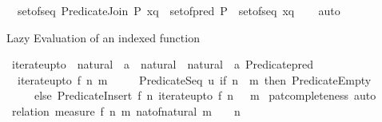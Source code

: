 \begin{isabellebody}
\ \ {\isachardoublequoteopen}set{\isacharunderscore}{\kern0pt}of{\isacharunderscore}{\kern0pt}seq\ {\isacharparenleft}{\kern0pt}Predicate{\isachardot}{\kern0pt}Join\ P\ xq{\isacharparenright}{\kern0pt}\ {\isacharequal}{\kern0pt}\ set{\isacharunderscore}{\kern0pt}of{\isacharunderscore}{\kern0pt}pred\ P\ {\isasymunion}\ set{\isacharunderscore}{\kern0pt}of{\isacharunderscore}{\kern0pt}seq\ xq{\isachardoublequoteclose}\isanewline
%
\isadelimproof
\ \ %
\endisadelimproof
%
\isatagproof
{}\isamarkupfalse%
\ auto%
\endisatagproof
{\isafoldproof}%
%
\isadelimproof
%
\endisadelimproof
%
\begin{isamarkuptext}%
Lazy Evaluation of an indexed function%
\end{isamarkuptext}\isamarkuptrue%
\isamarkupfalse%
\ iterate{\isacharunderscore}{\kern0pt}upto\ {\isacharcolon}{\kern0pt}{\isacharcolon}{\kern0pt}\ {\isachardoublequoteopen}{\isacharparenleft}{\kern0pt}natural\ {\isasymRightarrow}\ {\isacharprime}{\kern0pt}a{\isacharparenright}{\kern0pt}\ {\isasymRightarrow}\ natural\ {\isasymRightarrow}\ natural\ {\isasymRightarrow}\ {\isacharprime}{\kern0pt}a\ Predicate{\isachardot}{\kern0pt}pred{\isachardoublequoteclose}\isanewline
{}\isanewline
\ \ {\isachardoublequoteopen}iterate{\isacharunderscore}{\kern0pt}upto\ f\ n\ m\ {\isacharequal}{\kern0pt}\isanewline
\ \ \ \ Predicate{\isachardot}{\kern0pt}Seq\ {\isacharparenleft}{\kern0pt}{\isacharpercent}{\kern0pt}u{\isachardot}{\kern0pt}\ if\ n\ {\isachargreater}{\kern0pt}\ m\ then\ Predicate{\isachardot}{\kern0pt}Empty\isanewline
\ \ \ \ \ else\ Predicate{\isachardot}{\kern0pt}Insert\ {\isacharparenleft}{\kern0pt}f\ n{\isacharparenright}{\kern0pt}\ {\isacharparenleft}{\kern0pt}iterate{\isacharunderscore}{\kern0pt}upto\ f\ {\isacharparenleft}{\kern0pt}n\ {\isacharplus}{\kern0pt}\ {}{\isacharparenright}{\kern0pt}\ m{\isacharparenright}{\kern0pt}{\isacharparenright}{\kern0pt}{\isachardoublequoteclose}\isanewline
%
\isadelimproof
%
\endisadelimproof
%
\isatagproof
{}\isamarkupfalse%
\ pat{\isacharunderscore}{\kern0pt}completeness\ auto%
\endisatagproof
{\isafoldproof}%
%
\isadelimproof
\isanewline
%
\endisadelimproof
\isanewline
{}\isamarkupfalse%
%
\isadelimproof
\ %
\endisadelimproof
%
\isatagproof
{}\isamarkupfalse%
\ {\isacharparenleft}{\kern0pt}relation\ {\isachardoublequoteopen}measure\ {\isacharparenleft}{\kern0pt}{\isacharpercent}{\kern0pt}{\isacharparenleft}{\kern0pt}f{\isacharcomma}{\kern0pt}\ n{\isacharcomma}{\kern0pt}\ m{\isacharparenright}{\kern0pt}{\isachardot}{\kern0pt}\ nat{\isacharunderscore}{\kern0pt}of{\isacharunderscore}{\kern0pt}natural\ {\isacharparenleft}{\kern0pt}m\ {\isacharplus}{\kern0pt}\ {}\ {\isacharminus}{\kern0pt}\ n{\isacharparenright}{\kern0pt}{\isacharparenright}{\kern0pt}{\isachardoublequoteclose}{\isacharparenright}{\kern0pt}\isanewline

\end{isabellebody}
